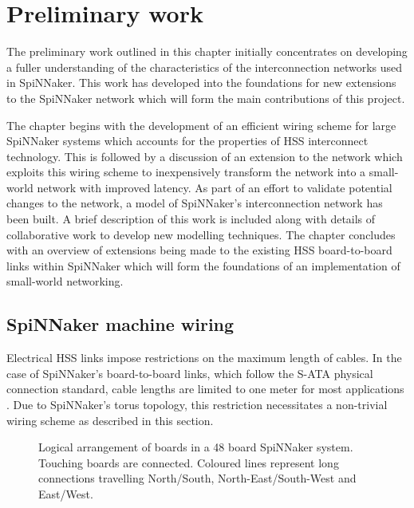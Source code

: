 \chapter{Preliminary work}
	\label{sec:preliminary-work}
	
	
	The preliminary work outlined in this chapter initially concentrates on
	developing a fuller understanding of the characteristics of the
	interconnection networks used in SpiNNaker. This work has developed into the
	foundations for new extensions to the SpiNNaker network which will form the
	main contributions of this project.
	
	The chapter begins with the development of an efficient wiring scheme for
	large SpiNNaker systems which accounts for the properties of HSS interconnect
	technology. This is followed by a discussion of an extension to the network
	which exploits this wiring scheme to inexpensively transform the network into
	a small-world network with improved latency.  As part of an effort to validate
	potential changes to the network, a model of SpiNNaker's interconnection
	network has been built. A brief description of this work is included along
	with details of collaborative work to develop new modelling techniques.  The
	chapter concludes with an overview of extensions being made to the existing
	HSS board-to-board links within SpiNNaker which will form the foundations of
	an implementation of small-world networking.
	
	\section{SpiNNaker machine wiring}
		
		
		Electrical HSS links impose restrictions on the maximum length of cables. In
		the case of SpiNNaker's board-to-board links, which follow the S-ATA
		physical connection standard, cable lengths are limited to one meter for
		most applications \cite{sata3spec}. Due to SpiNNaker's torus topology, this
		restriction necessitates a non-trivial wiring scheme as described in this
		section.
		
		\begin{figure}
			\center
			
			\caption[Logical arrangement of boards in a 48 board SpiNNaker
			system.]{Logical arrangement of boards in a 48 board SpiNNaker system.
			Touching boards are connected. Coloured lines represent long connections
			travelling {\color{red}North/South},
			{\color{green}North-East/South-West} and {\color{blue}East/West}.}
			\label{fig:boardsLogical}
		\end{figure}
		
